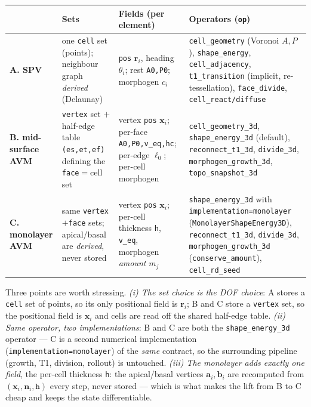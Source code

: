 \documentclass[11pt]{article}
\begin{document}
\begin{center}\small
\begin{tabular}{@{}p{1.9cm}p{3.0cm}p{3.6cm}p{4.9cm}@{}}
\toprule
 & \textbf{Sets} & \textbf{Fields (per element)} & \textbf{Operators (\texttt{op})} \\
\midrule
\textbf{A. SPV} & one \texttt{cell} set (points); neighbour graph \emph{derived} (Delaunay) &
\texttt{pos} $\mathbf r_i$, heading $\theta_i$; rest \texttt{A0,P0}; morphogen $c_i$ &
\texttt{cell\_geometry} (Voronoi $A,P$), \texttt{shape\_energy}, \texttt{cell\_adjacency},
\texttt{t1\_transition} (implicit, re-tessellation), \texttt{face\_divide}, \texttt{cell\_react/diffuse} \\
\addlinespace
\textbf{B. mid-surface AVM} & \texttt{vertex} set $+$ half-edge table \texttt{(es,et,ef)} defining the
\texttt{face}$=$cell set &
vertex \texttt{pos} $\mathbf x_i$; per-face \texttt{A0,P0,v\_eq,hc}; per-edge $\ell_0$; per-cell morphogen &
\texttt{cell\_geometry\_3d}, \texttt{shape\_energy\_3d} (default), \texttt{reconnect\_t1\_3d},
\texttt{divide\_3d}, \texttt{morphogen\_growth\_3d}, \texttt{topo\_snapshot\_3d} \\
\addlinespace
\textbf{C. monolayer AVM} & same \texttt{vertex}$+$\texttt{face} sets; apical/basal are \emph{derived}, never
stored &
vertex \texttt{pos} $\mathbf x_i$; per-cell thickness \texttt{h}, \texttt{v\_eq}, morphogen \emph{amount}
$m_j$ &
\texttt{shape\_energy\_3d} with \texttt{implementation=monolayer} (\texttt{MonolayerShapeEnergy3D}),
\texttt{reconnect\_t1\_3d}, \texttt{divide\_3d}, \texttt{morphogen\_growth\_3d} (\texttt{conserve\_amount}),
\texttt{cell\_rd\_seed} \\
\bottomrule
\end{tabular}
\end{center}

\noindent Three points are worth stressing. \emph{(i) The set choice is the DOF choice}: A stores a
\texttt{cell} set of points, so its only positional field is $\mathbf r_i$; B and C store a \texttt{vertex}
set, so the positional field is $\mathbf x_i$ and cells are read off the shared half-edge table.
\emph{(ii) Same operator, two implementations}: B and C are both the \texttt{shape\_energy\_3d} operator --- C
is a second numerical implementation (\texttt{implementation=monolayer}) of the \emph{same} contract, so the
surrounding pipeline (growth, T1, division, rollout) is untouched. \emph{(iii) The monolayer adds exactly one
field}, the per-cell thickness \texttt{h}: the apical/basal vertices $\mathbf a_i,\mathbf b_i$ are recomputed
from $(\mathbf x_i,\mathbf n_i,\texttt{h})$ every step, never stored --- which is what makes the lift from B to
C cheap and keeps the state differentiable.
\end{document}
